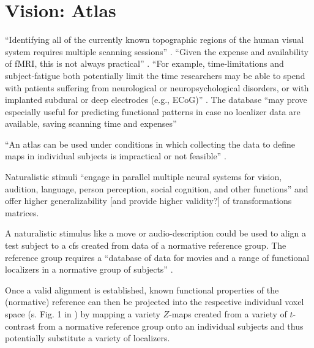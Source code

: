 \section{Vision: Atlas}




``Identifying all of the currently known topographic regions of the human visual
system requires multiple scanning sessions'' \citep{wang2015probabilistic}.
%
``Given the expense and availability of fMRI, this is not always practical''
\citep{wang2015probabilistic}.
%
``For example, time-limitations and subject-fatigue both potentially limit the
time researchers may be able to spend with patients suffering from neurological
or neuropsychological disorders, or with implanted subdural or deep electrodes
(e.g., ECoG)'' \citep{wang2015probabilistic}.
%
The database ``may prove especially useful for predicting functional patterns in
case no localizer data are available, saving scanning time and expenses''
\citep{rosenke2021probabilistic}

%
``An atlas can be used under conditions in which collecting the data to define
maps in individual subjects is impractical or not feasible''
\citep{wang2015probabilistic}.


%
Naturalistic stimuli ``engage in parallel multiple neural systems for vision,
audition, language, person perception, social cognition, and other functions''
\citep{jiahui2020predicting} and offer higher generalizability [and provide
higher validity?] of transformations matrices.

%
A naturalistic stimulus like a move or audio-description could be used to align
a test subject to a \ac{cfs} created from data of a normative reference group.
%
The reference group requires a ``database of data for movies and a range of
functional localizers in a normative group of subjects''
\citep{jiahui2020predicting}.

%
Once a valid alignment is established, known functional properties of the
(normative) reference can then be projected into the respective individual voxel
space (s. Fig. 1 in \citep{nishimoto2016lining}) by mapping a variety $Z$-maps
created from a variety of $t$-contrast from a normative reference group onto an
individual subjects and thus potentially substitute a variety of localizers.

